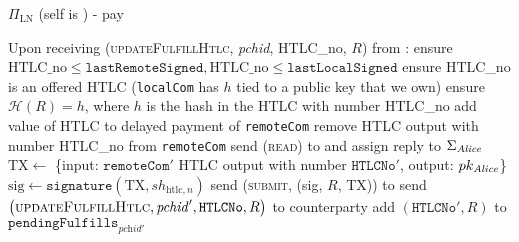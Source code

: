 \begin{protocolbox}{$\Pi_{\mathrm{LN}}$ (self is \alice) - pay}
\begin{algorithmic}[1]
    \State Upon receiving (\textsc{updateFulfillHtlc}, \textit{pchid}, HTLC\_no,
    $R$) from \bob:
    \Indent
      \State ensure $\mathrm{HTLC\_no} \leq \mathtt{lastRemoteSigned},
      \mathrm{HTLC\_no} \leq \mathtt{lastLocalSigned}$
      \State ensure HTLC\_no is an offered HTLC (\texttt{localCom} has $h$ tied
      to a public key that we own)
      \State ensure $\mathcal{H}\left(R\right) = h$, where $h$ is the hash in
      the HTLC with number HTLC\_no
      \State add value of HTLC to delayed payment of \texttt{remoteCom}
      \State remove HTLC output with number HTLC\_no from \texttt{remoteCom}
       
         
          \State send (\textsc{read}) to \ledger{} and assign reply to
          $\Sigma_{\mathit{Alice}}$
            \State $\mathrm{TX} \gets$ \{input: $\mathtt{remoteCom}'$ HTLC
            output with number $\mathtt{HTLCNo}'$, output: $pk_{\mathit{Alice}}$\}
            \State $\mathrm{sig} \gets \mathtt{signature}\left(\mathrm{TX},
            sh_{\mathrm{htlc}, n}\right)$
            \State send (\textsc{submit}, (sig, $R$, TX)) to \ledger{}
          \Else {}
            \State send $\left(\textsc{updateFulfillHtlc}, \mathit{pchid}',
            \mathtt{HTLCNo}, R\right)$ to counterparty
          \EndIf
        \Else {}
          \State add $\left(\mathtt{HTLCNo}', R\right)$ to
          $\mathtt{pendingFulfills}_{\textit{pchid}'}$
        \EndIf
      \EndIf
    \EndIndent
    \State


\end{algorithmic}
\end{protocolbox}
